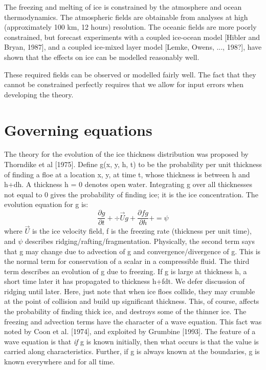     The freezing and melting of ice is constrained by the atmosphere and
ocean thermodynamics.  The atmospheric fields are obtainable from analyses
at high (approximately 100 km, 12 hours) resolution.  The oceanic fields are 
more poorly constrained, but forecast experiments with a coupled ice-ocean
model [Hibler and Bryan, 1987], and a coupled ice-mixed layer model [Lemke,
Owens, ..., 198?], have shown that the effects on ice can be modelled
reasonably well.  

    These required fields can be observed or modelled fairly well.  The
fact that they cannot be constrained perfectly requires that we allow for
input errors when developing the theory.
\section{Governing equations}

    The theory for the evolution of the ice thickness distribution was
proposed by Thorndike et al [1975].  Define g(x, y, h, t) to be the 
probability per unit thickness of finding a floe at a location x, y, at 
time t, whose thickness is between h and h+dh.  A thickness h = 0 denotes
open water.  Integrating g over all thicknesses not equal to 0 gives
the probability of finding ice; it is the ice concentration.  The evolution
equation for g is:
\begin{equation}
\frac {\partial g}{\partial t} +
\div \vec{U}g +
\frac {\partial fg} {\partial h} +
= \psi
\end{equation}
\noindent where $\vec{U}$ is the ice velocity field, f is the freezing rate
(thickness per unit time), and $\psi$ describes ridging/rafting/fragmentation.
Physically, the second term says that g may change due to advection of g and
convergence/divergence of g.  This is the normal term for conservation of
a scalar in a compressible fluid.  The third term describes an evolution of
g due to freezing.  If g is large at thickness h, a short time later it has
propagated to thickness h+fdt.  We defer discussion of
ridging until later.  Here, just note that when ice floes collide, they
may crumble at the point of collision and build up significant thickness.
This, of course, affects the probability of finding thick ice, and destroys
some of the thinner ice. The freezing and advection terms have the character 
of a wave equation.  This fact was noted by Coon
et al. [1974], and exploited by Grumbine [1993].  The feature of a wave 
equation is that {\it if} g is known initially, then what occurs is that
the value is carried along characteristics.  Further, if g is always known
at the boundaries, g is known everywhere and for all time.

